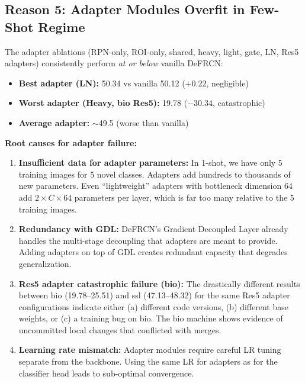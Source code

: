 \documentclass[11pt,a4paper]{article}
\begin{document}
\subsection{Reason 5: Adapter Modules Overfit in Few-Shot Regime}

The adapter ablations (RPN-only, ROI-only, shared, heavy, light, gate, LN, Res5 adapters) consistently perform \textit{at or below} vanilla DeFRCN:

\begin{itemize}[nosep]
    \item \textbf{Best adapter (LN):} 50.34 vs vanilla 50.12 ($+0.22$, negligible)
    \item \textbf{Worst adapter (Heavy, bio Res5):} 19.78 ($-30.34$, catastrophic)
    \item \textbf{Average adapter:} $\sim$49.5 (worse than vanilla)
\end{itemize}

\textbf{Root causes for adapter failure:}
\begin{enumerate}[nosep]
    \item \textbf{Insufficient data for adapter parameters:} In 1-shot, we have only 5 training images for 5 novel classes. Adapters add hundreds to thousands of new parameters. Even ``lightweight'' adapters with bottleneck dimension 64 add $2 \times C \times 64$ parameters per layer, which is far too many relative to the 5 training images.

    \item \textbf{Redundancy with GDL:} DeFRCN's Gradient Decoupled Layer already handles the multi-stage decoupling that adapters are meant to provide. Adding adapters on top of GDL creates redundant capacity that degrades generalization.

    \item \textbf{Res5 adapter catastrophic failure (bio):} The drastically different results between bio (19.78--25.51) and ssl (47.13--48.32) for the same Res5 adapter configurations indicate either (a) different code versions, (b) different base weights, or (c) a training bug on bio. The bio machine shows evidence of uncommitted local changes that conflicted with merges.

    \item \textbf{Learning rate mismatch:} Adapter modules require careful LR tuning separate from the backbone. Using the same LR for adapters as for the classifier head leads to sub-optimal convergence.
\end{enumerate}
\end{document}
